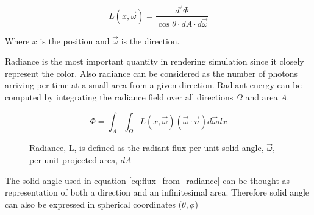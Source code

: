 \begin{equation}
L(x, \overrightarrow{\omega}) = \frac{d^{2}\Phi}{\cos{\theta} \cdot dA \cdot d\overrightarrow{\omega}}
\end{equation}

Where \(x\) is the position and \(\overrightarrow{\omega}\) is the direction. 

Radiance is the most important quantity in rendering simulation since it closely represent the color. Also radiance can be considered as the number of photons arriving per time at a small area from a given direction. Radiant energy can be computed by integrating the radiance field over all directions \(\Omega\) and area \(A\).

\begin{equation} 
\Phi = \int_{A}\int_{\Omega}L(x, \overrightarrow{\omega})(\overrightarrow{\omega} \cdot \overrightarrow{n})d\overrightarrow{\omega}dx
\label{eq:flux_from_radiance}
\end{equation} 

\begin{figure}[htp] 
    \centering 
    \renewcommand{\thefigure}{\thechapter.\arabic{figure}}
    \caption[]{Radiance, L, is defined as the radiant flux per unit solid angle, \(\overrightarrow{\omega}\), per unit projected area, \(dA\)}
    \label{fig:solid_angle_sphere} 
\end{figure}

The solid angle used in equation \ref{eq:flux_from_radiance} can be thought as representation of both a direction and an infinitesimal area. Therefore solid angle can also be expressed in spherical coordinates (\(\theta, \phi\))

